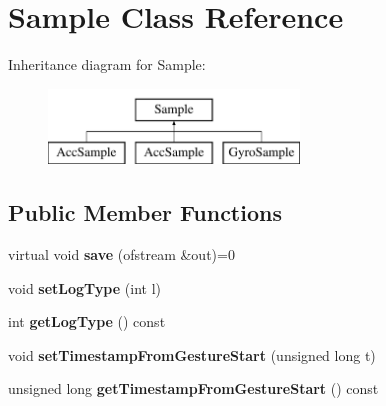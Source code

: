 \hypertarget{class_sample}{\section{Sample Class Reference}
\label{class_sample}
}
Inheritance diagram for Sample\-:\begin{figure}[H]
\begin{center}
\leavevmode
\includegraphics[height=2.000000cm]{class_sample}
\end{center}
\end{figure}
\subsection*{Public Member Functions}
\begin{DoxyCompactItemize}
\item 
\hypertarget{class_sample_a4f65c4a8bb86396782450121c7dc5ba5}{virtual void {\bfseries save} (ofstream \&out)=0}\label{class_sample_a4f65c4a8bb86396782450121c7dc5ba5}

\item 
\hypertarget{class_sample_ae728243bef5e290d46a2851ea2ce5fe2}{void {\bfseries set\-Log\-Type} (int l)}\label{class_sample_ae728243bef5e290d46a2851ea2ce5fe2}

\item 
\hypertarget{class_sample_aafff0e8223f3eafa001611a63f194c8a}{int {\bfseries get\-Log\-Type} () const }\label{class_sample_aafff0e8223f3eafa001611a63f194c8a}

\item 
\hypertarget{class_sample_a05edd06782fa94517b8daeb29e12057d}{void {\bfseries set\-Timestamp\-From\-Gesture\-Start} (unsigned long t)}\label{class_sample_a05edd06782fa94517b8daeb29e12057d}

\item 
\hypertarget{class_sample_a94a34fe92c0f8a89485042aaea458d94}{unsigned long {\bfseries get\-Timestamp\-From\-Gesture\-Start} () const }\label{class_sample_a94a34fe92c0f8a89485042aaea458d94}

\end{DoxyCompactItemize}
